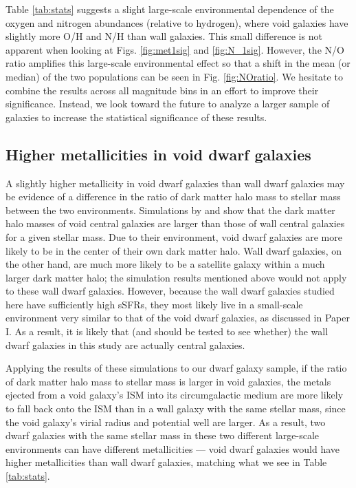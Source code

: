 Table \ref{tab:stats} suggests a slight large-scale environmental dependence of 
the oxygen and nitrogen abundances (relative to hydrogen), where void galaxies 
have slightly more O/H and N/H than wall galaxies.  This small difference is 
not apparent when looking at Figs. \ref{fig:met1sig} and \ref{fig:N_1sig}.  
However, the N/O ratio amplifies this large-scale environmental effect so that a 
shift in the mean (or median) of the two populations can be seen in Fig. 
\ref{fig:NOratio}.  We hesitate to combine the results across all magnitude bins 
in an effort to improve their significance.  Instead, we look toward the future 
to analyze a larger sample of galaxies to increase the statistical significance 
of these results.

\subsection{Higher metallicities in void dwarf galaxies}

A slightly higher metallicity in void dwarf galaxies than wall dwarf galaxies 
may be evidence of a difference in the ratio of dark matter halo mass to stellar 
mass between the two environments.  Simulations by \cite{Jung14} and 
\cite{Tonnesen15} show that the dark matter halo masses of void central galaxies 
are larger than those of wall central galaxies for a given stellar mass.  Due to 
their environment, void dwarf galaxies are more likely to be in the center of 
their own dark matter halo.  Wall dwarf galaxies, on the other hand, are much 
more likely to be a satellite galaxy within a much larger dark matter halo; the 
simulation results mentioned above would not apply to these wall dwarf galaxies.  
However, because the wall dwarf galaxies studied here have sufficiently high 
sSFRs, they most likely live in a small-scale environment very similar to that 
of the void dwarf galaxies, as discussed in Paper I.  As a result, it is likely 
that (and should be tested to see whether) the wall dwarf galaxies in this study 
are actually central galaxies.  

Applying the results of these simulations to our dwarf galaxy sample, if the 
ratio of dark matter halo mass to stellar mass is larger in void galaxies, the 
metals ejected from a void galaxy's ISM into its circumgalactic medium are more 
likely to fall back onto the ISM than in a wall galaxy with the same stellar 
mass, since the void galaxy's virial radius and potential well are larger.  As a 
result, two dwarf galaxies with the same stellar mass in these two different 
large-scale environments can have different metallicities --- void dwarf 
galaxies would have higher metallicities than wall dwarf galaxies, matching what 
we see in Table \ref{tab:stats}.

